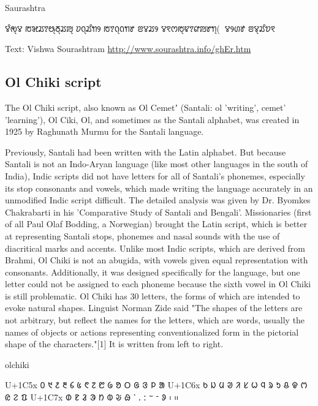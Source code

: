 \begin{scriptexample}[]{Saurashtra}
\bgroup
\saurashtra

ꢮꢶꢯ꣄ꢮ ꢱꣃꢬꢵꢰ꣄ꢜ꣄ꢬꢪ꣄ ꢦꢡ꣄ꢬꢶꢒꢾ ꢱꢵꢡ꣄ꢡꢒꢸ ꢂꢮꢬꢾ
ꢮꣁꢭꢱ꣄ꢢꢵꢥꢪꢸꢒ꣄(ꣀꢵꢮꢾꢔꢹ ꢂꢮ꣄ꢬꢶꢫꣁ


\arial

Text: Vishwa Sourashtram \url{http://www.sourashtra.info/ghEr.htm}
\egroup
\end{scriptexample}

\subsection{Ol Chiki script}

The Ol Chiki script, also known as Ol Cemetʼ (Santali: ol 'writing', cemet' 'learning'), Ol Ciki, Ol, and sometimes as the Santali alphabet, was created in 1925 by Raghunath Murmu for the Santali language.

Previously, Santali had been written with the Latin alphabet. But because Santali is not an Indo-Aryan language (like most other languages in the south of India), Indic scripts did not have letters for all of Santali's phonemes, especially its stop consonants and vowels, which made writing the language accurately in an unmodified Indic script difficult. The detailed analysis was given by Dr. Byomkes Chakrabarti in his 'Comparative Study of Santali and Bengali'. Missionaries (first of all Paul Olaf Bodding, a Norwegian) brought the Latin script, which is better at representing Santali stops, phonemes and nasal sounds with the use of diacritical marks and accents. Unlike most Indic scripts, which are derived from Brahmi, Ol Chiki is not an abugida, with vowels given equal representation with consonants. Additionally, it was designed specifically for the language, but one letter could not be assigned to each phoneme because the sixth vowel in Ol Chiki is still problematic.
Ol Chiki has 30 letters, the forms of which are intended to evoke natural shapes. Linguist Norman Zide said "The shapes of the letters are not arbitrary, but reflect the names for the letters, which are words, usually the names of objects or actions representing conventionalized form in the pictorial shape of the characters."[1] It is written from left to right.

\newfontfamily{}

\begin{scriptexample}[]{olchiki}
\bgroup
\olchiki
\obeylines

U+1C5x 	᱐	᱑	᱒	᱓	᱔	᱕	᱖	᱗	᱘	᱙	ᱚ	ᱛ	ᱜ	ᱝ	ᱞ	ᱟ
U+1C6x	   ᱠ	ᱡ	ᱢ	ᱣ	ᱤ	ᱥ	ᱦ	ᱧ	ᱨ	ᱩ	ᱪ	ᱫ	ᱬ	ᱭ	ᱮ	ᱯ
U+1C7x  	ᱰ	ᱱ	ᱲ	ᱳ	ᱴ	ᱵ	ᱶ	ᱷ	ᱸ	ᱹ	ᱺ	ᱻ	ᱼ	ᱽ	᱾	᱿
\egroup
\end{scriptexample}

